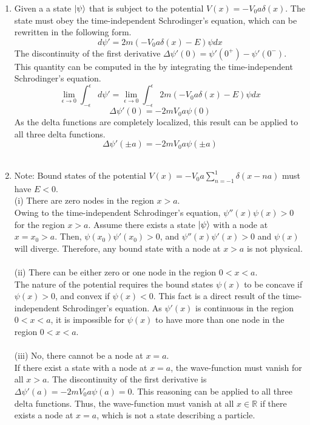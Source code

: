 \begin{sol}
\begin{enumerate}[label=\textbf{(\alph*)}]

	
	\item
	Given a a state $\ket\psi$ that is subject to the potential $V(x)=-V_0a\delta(x)$. The state must obey the time-independent Schrodinger's equation, which can be rewritten in the following form.
	$$d\psi'=2m(-V_0a\delta(x)-E)\psi dx$$
	The discontinuity of the first derivative $\Delta\psi'(0)=\psi'(0^+)-\psi'(0^-)$. This quantity can be computed in the by integrating the time-independent Schrodinger's equation.
	$$\lim_{\epsilon \to 0}\int_{-\epsilon}^{\epsilon}d\psi'=
	\lim_{\epsilon \to 0}\int_{-\epsilon}^{\epsilon}2m(-V_0a\delta(x)-E)\psi dx$$
	$$\Delta\psi'(0)=-2mV_0a\psi(0)$$
	As the delta functions are completely localized, this result can be applied to all three delta functions.
	$$\Delta\psi'(\pm a)=-2mV_0a\psi(\pm a)$$
	\\
	\item
	Note: Bound states of the potential $V(x)=-V_0a\displaystyle{\sum_{n=-1}^1\delta(x-na)}$ must have $E<0$. \\
	(i) There are zero nodes in the region $x>a$.\\Owing to the time-independent Schrodinger's equation, $\psi''(x)\psi(x)>0$ for the region $x>a$. Assume there exists a state $\ket\psi$ with a node at $x=x_0>a$. Then, $\psi(x_0)\psi'(x_0)>0$, and $\psi''(x)\psi'(x)>0$ and $\psi(x)$ will diverge. Therefore, any bound state with a node at $x>a$ is not physical.\\\\
    (ii) There can be either zero or one node in the region $0 < x < a$.\\
    The nature of the potential requires the bound states $\psi(x)$ to be concave if $\psi(x)>0$, and convex if $\psi(x)<0$. This fact is a direct result of the time-independent Schrodinger's equation. As $\psi'(x)$ is continuous in the region $0 < x < a$, it is impossible for $\psi(x)$ to have more than one node in the region $0 < x < a$.\\\\
    (iii) No, there cannot be a node at $x=a$. \\
    If there exist a state with a node at $x=a$, the wave-function must vanish for all $x>a$. The discontinuity of the first derivative is $\Delta\psi'(a)=-2mV_0a\psi(a)=0$. This reasoning can be applied to all three delta functions. Thus, the wave-function must vanish at all $x\in\mathbb{R}$ if there exists a node at $x=a$, which is not a state describing a particle.\\\\

\end{enumerate}
\end{sol}
